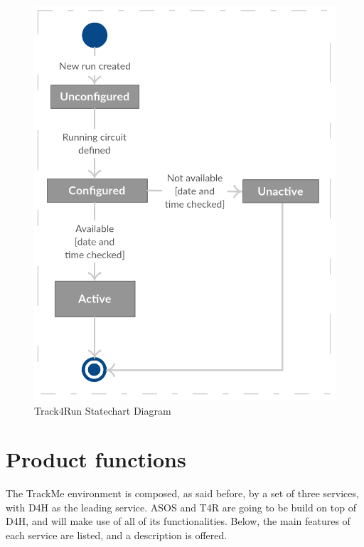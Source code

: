 \documentclass[a4paper, hidelinks, 12pt]{report}
\begin{document}
	\begin{figure}[H]
		\centering
		\includegraphics[scale=0.55]{Diagrams/t4r_statechart.png}
		\caption[Track4Run Statechart Diagram]{Track4Run Statechart Diagram}
		\label{fig:t4r_statechart}
	\end{figure}
	
	\section{Product functions}
	The TrackMe environment is composed, as said before, by a set of three services, with D4H as the leading service. ASOS and T4R are going to be build on top of D4H, and will make use of all of its functionalities. Below, the main features of each service are listed, and a description is offered.
	
\end{document}
